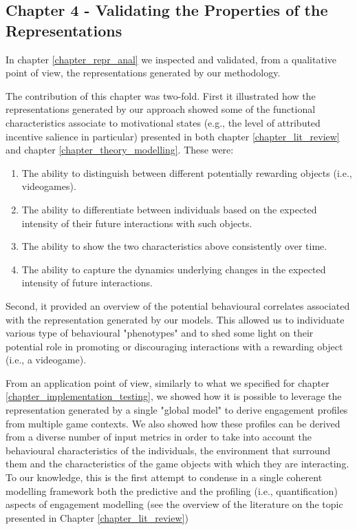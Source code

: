 \subsection{Chapter 4 - Validating the Properties of the Representations}
\label{discussion_chapter_four}
In chapter \ref{chapter_repr_anal} we inspected and validated, from a qualitative point of view, the representations generated by our methodology.

The contribution of this chapter was two-fold. First it illustrated how the representations generated by our approach showed some of the functional characteristics associate to motivational states (e.g., the level of attributed incentive salience in particular) presented in both chapter \ref{chapter_lit_review} and chapter \ref{chapter_theory_modelling}. These were:

\begin{enumerate}
    \item The ability to distinguish between different potentially rewarding objects (i.e., videogames).
    \item The ability to differentiate between individuals based on the expected intensity of their future interactions with such objects.
    \item The ability to show the two characteristics above consistently over time.
    \item The ability to capture the dynamics underlying changes in the expected intensity of future interactions.
\end{enumerate}

Second, it provided an overview of the potential behavioural correlates associated with the representation generated by our models. This allowed us to individuate various type of behavioural "phenotypes" and to shed some light on their potential role in promoting or discouraging interactions with a rewarding object (i.e., a videogame).

From an application point of view, similarly to what we specified for chapter \ref{chapter_implementation_testing}, we showed how it is possible to leverage the representation generated by a single "global model" to derive engagement profiles from multiple game contexts. We also showed how these profiles can be derived from a diverse number of input metrics in order to take into account the behavioural characteristics of the individuals, the environment that surround them and the characteristics of the game objects with which they are interacting. To our knowledge, this is the first attempt to condense in a single coherent modelling framework both the predictive and the profiling (i.e., quantification) aspects of engagement modelling (see the overview of the literature on the topic presented in Chapter \ref{chapter_lit_review})

